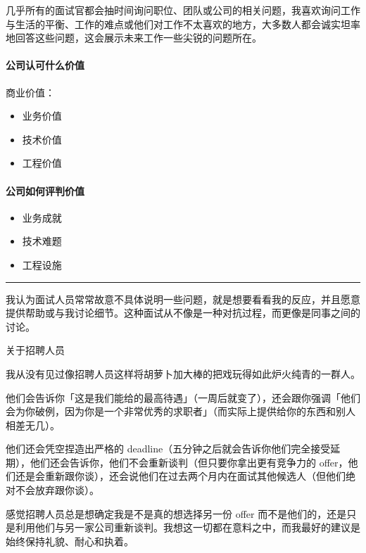 \documentclass[letterpaper,11pt,english]{sphinxmanual}
\begin{document}
几乎所有的面试官都会抽时间询问职位、团队或公司的相关问题，我喜欢询问工作与生活的平衡、工作的难点或他们对工作不太喜欢的地方，大多数人都会诚实坦率地回答这些问题，这会展示未来工作一些尖锐的问题所在。


\paragraph{公司认可什么价值}
\label{\detokenize{chapter_interview/offer:id2}}
商业价值：
\begin{itemize}
\item {} 
业务价值

\item {} 
技术价值

\item {} 
工程价值

\end{itemize}


\paragraph{公司如何评判价值}
\label{\detokenize{chapter_interview/offer:id3}}\begin{itemize}
\item {} 
业务成就

\item {} 
技术难题

\item {} 
工程设施

\end{itemize}


\bigskip\hrule\bigskip


我认为面试人员常常故意不具体说明一些问题，就是想要看看我的反应，并且愿意提供帮助或与我讨论细节。这种面试从不像是一种对抗过程，而更像是同事之间的讨论。

关于招聘人员

我从没有见过像招聘人员这样将胡萝卜加大棒的把戏玩得如此炉火纯青的一群人。

他们会告诉你「这是我们能给的最高待遇」（一周后就变了），还会跟你强调「他们会为你破例，因为你是一个非常优秀的求职者」（而实际上提供给你的东西和别人相差无几）。

他们还会凭空捏造出严格的
deadline（五分钟之后就会告诉你他们完全接受延期），他们还会告诉你，他们不会重新谈判（但只要你拿出更有竞争力的
offer，他们还是会重新跟你谈），还会说他们在过去两个月内在面试其他候选人（但他们绝对不会放弃跟你谈）。

感觉招聘人员总是想确定我是不是真的想选择另一份 offer
而不是他们的，还是只是利用他们与另一家公司重新谈判。我想这一切都在意料之中，而我最好的建议是始终保持礼貌、耐心和执着。
\end{document}
